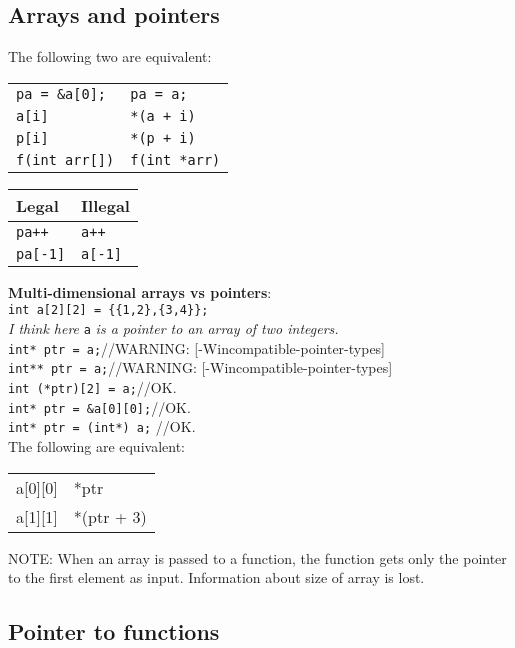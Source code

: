 \begin{multicols*}{3}
\subsection{Arrays and pointers}
The following two are equivalent:\\

\begin{tabular}{l|l}
\hline
\texttt{pa = \&a[0];} & \texttt{pa = a;}\\
\texttt{a[i]} & \texttt{*(a + i)}\\
\texttt{p[i]} & \texttt{*(p + i)}\\
\texttt{f(int arr[])} & \texttt{f(int *arr)}\\
\hline
\end{tabular}

\begin{tabular}{l|l}
\hline
Legal & Illegal\\
\hline
\texttt{pa++} & \texttt{a++}\\
\texttt{pa[-1]} & \texttt{a[-1]}\\
\hline
\end{tabular}

\textbf{Multi-dimensional arrays vs pointers}:\\
\texttt{int a[2][2] = \{\{1,2\},\{3,4\}\};}\\
\textit{I think here} \texttt{a} \textit{is a pointer to an array of two integers.}\\
\texttt{int* ptr = a;}//WARNING: [-Wincompatible-pointer-types]\\
\texttt{int** ptr = a;}//WARNING: [-Wincompatible-pointer-types]\\
\texttt{int (*ptr)[2] = a;}//OK.\\
\texttt{int* ptr = \&a[0][0];}//OK.\\
\texttt{int* ptr = (int*) a;} //OK.\\
The following are equivalent:\\
\begin{tabular}{ll}
\hline
a[0][0] & *ptr \\
a[1][1] & *(ptr + 3)\\
\hline
\end{tabular}

NOTE: When an array is passed to a function, the function gets only the pointer to the first element as input. Information about size of array is lost.\\


\subsection{Pointer to functions}




\end{multicols*}
